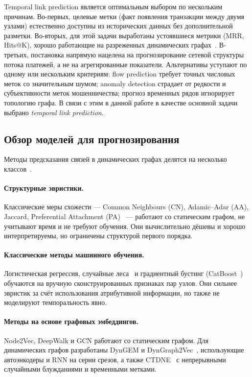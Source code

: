 \documentclass[a4paper,12pt]{extarticle}
\begin{document}
Temporal link prediction является оптимальным выбором по нескольким причинам. Во-первых, целевые метки (факт появления транзакции между двумя узлами) естественно доступны из исторических данных без дополнительной разметки. Во-вторых, для этой задачи выработаны устоявшиеся метрики (MRR, Hits@K), хорошо работающие на разреженных динамических графах~\cite{poursafaei2022towards}. В-третьих, постановка напрямую нацелена на прогнозирование сетевой структуры потока платежей, а не на агрегированные показатели. Альтернативы уступают по одному или нескольким критериям: flow prediction требует точных числовых меток со значительным шумом; anomaly detection страдает от редкости и субъективности меток мошенничества; прогноз временных рядов игнорирует топологию графа. В связи с этим в данной работе в качестве основной задачи выбрано \emph{temporal link prediction}.

\subsection*{Обзор моделей для прогнозирования}

Методы предсказания связей в динамических графах делятся на несколько классов~\cite{kazemi2020representation, xiong2026survey}.

\paragraph{Структурные эвристики.}
Классические меры схожести --- Common Neighbours (CN), Adamic--Adar (AA), Jaccard, Preferential Attachment (PA)~\cite{liben2007link, adamic2003friends, barabasi1999emergence} --- работают со статическим графом, не учитывают время и не требуют обучения. Они вычислительно дёшевы и хорошо интерпретируемы, но ограничены структурой первого порядка.

\paragraph{Классические методы машинного обучения.}
Логистическая регрессия, случайные леса~\cite{breiman2001random} и градиентный бустинг (CatBoost~\cite{prokhorenkova2018catboost}) обучаются на вручную сконструированных признаках пар узлов. Они сильнее эвристик за счёт использования атрибутивной информации, но также не моделируют темпоральность явно.

\paragraph{Методы на основе графовых эмбеддингов.}
Node2Vec, DeepWalk и GCN работают со статическим графом. Для динамических графов разработаны DynGEM и DynGraph2Vec~\cite{goyal2018dynamgem}, использующие автоэнкодеры и RNN на серии срезов, а также CTDNE~\cite{nguyen2018continuous} с непрерывными случайными блужданиями и временными метками.
\end{document}
